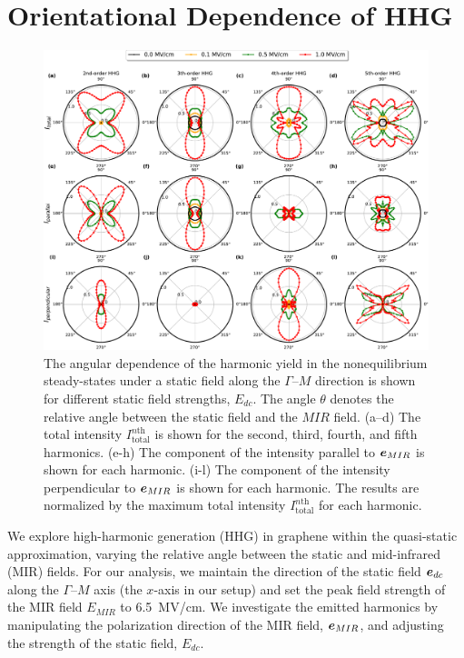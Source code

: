 \section{Orientational Dependence of HHG}
\begin{figure}[ht]
\centering
\includegraphics[width=1.0\linewidth]{pic/polar.pdf}
\caption{\label{fig:polar}
The angular dependence of the harmonic yield in the nonequilibrium steady-states under a static field along the $\Gamma$--$M$ direction is shown for different static field strengths, $E_{dc}$. The angle $\theta$ denotes the relative angle between the static field and the $MIR$ field. (a--d) The total intensity $I^{n \textrm{th}}_{\mathrm{total}}$ is shown for the second, third, fourth, and fifth harmonics. (e-h) The component of the intensity parallel to $\boldsymbol e_{MIR}$ is shown for each harmonic. (i-l) The component of the intensity perpendicular to $\boldsymbol e_{MIR}$ is shown for each harmonic. The results are normalized by the maximum total intensity $I^{n \textrm{th}}_{\mathrm{total}}$ for each harmonic.
}
\end{figure}

We explore high-harmonic generation (HHG) in graphene within the quasi-static approximation, varying the relative angle between the static and mid-infrared (MIR) fields. For our analysis, we maintain the direction of the static field $\boldsymbol e_{dc}$ along the $\Gamma$--$M$ axis (the $x$-axis in our setup) and set the peak field strength of the MIR field $E_{MIR}$ to 6.5~MV/cm. We investigate the emitted harmonics by manipulating the polarization direction of the MIR field, $\boldsymbol e_{MIR}$, and adjusting the strength of the static field, $E_{dc}$.

